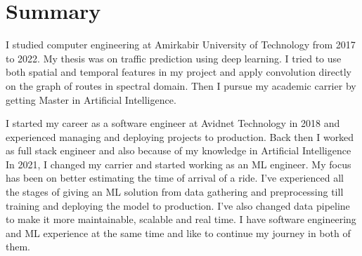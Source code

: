 \section{Summary}\closesection{}

I studied computer engineering at Amirkabir University of Technology from 2017 to 2022.
My thesis was on traffic prediction using deep learning.
I tried to use both spatial and temporal features in my project and apply
convolution directly on the graph of routes in spectral domain.
Then I pursue my academic carrier by getting Master in Artificial Intelligence.

I started my career as a software engineer at Avidnet Technology in 2018 and experienced managing
and deploying projects to production. Back then I worked as full stack engineer and also because
of my knowledge in Artificial Intelligence
In 2021, I changed my carrier and started working as an ML engineer.
My focus has been on better estimating the time of arrival of a ride.
I've experienced all the stages of giving an ML solution from data gathering and preprocessing
till training and deploying the model to production.
I've also changed data pipeline to make it more maintainable, scalable and real time.
I have software engineering and ML experience at the same time and like to continue my journey in both of them.